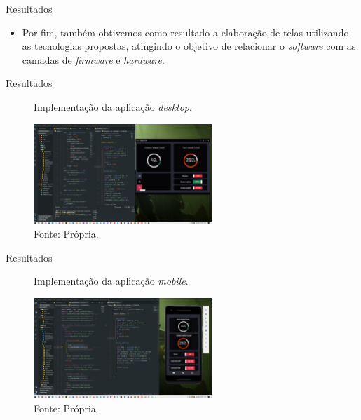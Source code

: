 \begin{frame}{Resultados}

  \begin{itemize}
    \item Por fim, também obtivemos como resultado a elaboração de telas utilizando as tecnologias propostas, atingindo o objetivo de relacionar o \textit{software} com as camadas de \textit{firmware} e \textit{hardware}.
  \end{itemize}
\end{frame}

\begin{frame}{Resultados}
  \begin{figure}[H]
    \centering
    \caption{Implementação da aplicação \textit{desktop}.}
    \includegraphics[width=0.6\textwidth]{figuras/rcs_desktop.png}
    \caption*{\tiny{Fonte: Própria.}}
    \label{fig:tela_desktop}
  \end{figure}
\end{frame}

\begin{frame}{Resultados}
  \begin{figure}[H]
    \centering
    \caption{Implementação da aplicação \textit{mobile}.}
    \includegraphics[width=0.6\textwidth]{figuras/rcs_mobile.png}
    \caption*{\tiny{Fonte: Própria.}}
    \label{fig:tela_mobile}
  \end{figure}
  
\end{frame}